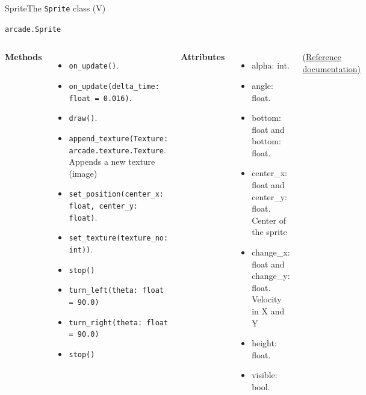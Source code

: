\documentclass[10pt,compress]{beamer} %
\begin{document}
\begin{frame}[plain]{Sprite}{The \texttt{Sprite} class (V)}
	\begin{block}{\texttt{arcade.Sprite}}
		\smallskip
		\begin{columns}[t]
			\centering \textbf{Methods}
		\begin{itemize}
		\item \footnotesize{\texttt{on\_update()}}. 
		\item \footnotesize{\texttt{on\_update(delta\_time: float = 0.016)}}. 
		\item \footnotesize{\texttt{draw()}}. 
		\item \footnotesize{\texttt{append\_texture(Texture: arcade.texture.Texture}}. \\ Appends a new texture (image)
		\item \footnotesize{\texttt{set\_position(center\_x: float, center\_y: float)}}. \\
		\item \footnotesize{\texttt{set\_texture(texture\_no: int))}}. \\
		\item \footnotesize{\texttt{stop()}} 
		\item \footnotesize{\texttt{turn\_left(theta: float = 90.0)}} 
		\item \footnotesize{\texttt{turn\_right(theta: float = 90.0)}} 
		\item \footnotesize{\texttt{stop()}} 
		\end{itemize}

			\centering \textbf{Attributes}
		\begin{itemize}
		\item \footnotesize{alpha: int}.
		\item \footnotesize{angle: float}. 
		\item \footnotesize{bottom: float} and \footnotesize{bottom: float}. 
		\item \footnotesize{center\_x: float} and \footnotesize{center\_y: float}.\\ Center of the sprite
		\item \footnotesize{change\_x: float} and \footnotesize{change\_y: float}.\\ Velocity in X and Y
		\item \footnotesize{height: float}. 
		\item \footnotesize{visible: bool}. 
		\end{itemize}
			\vfill
	\href{https://api.arcade.academy/en/latest/api/sprites.html}{(Reference documentation)}
    	\end{columns}
	\end{block}	

\end{frame}
\end{document}
